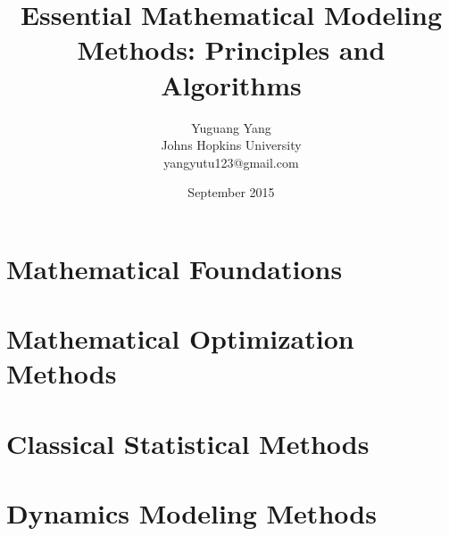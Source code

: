 \documentclass[oneside,hidelinks,12pt,letterpaper]{scrbook} %
\title{\huge \textbf{Essential Mathematical Modeling Methods: Principles and Algorithms}}
\author{Yuguang Yang \\
Johns Hopkins University \\yangyutu123@gmail.com }
\date{September 2015}
\theoremstyle{remark}
\theoremstyle{coloredRemark}
\theoremstyle{coloredNote}
\begin{document}
\sloppy



\hypersetup{colorlinks=false}

\newpage

\listofalgorithms
\listoffigures
\listoftables

\dominitoc
\tableofcontents 



\hypersetup{
	colorlinks=true,
	linkcolor=blue}

\mainmatter

\printnomenclature



\iffalse

\part{Mathematical Foundations}
%
%
%
\startcontents[chapters]

\part{Mathematical Optimization Methods}

%


\startcontents[chapters]
\part{Classical Statistical Methods}
%
%
%
%
%
\startcontents[chapters]
\part{Dynamics Modeling Methods}


%
%
%
%
\end{document}
